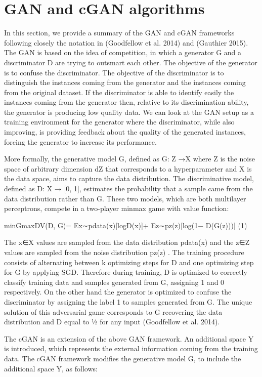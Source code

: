 \documentclass[parskip=full]{scrartcl}
\begin{document}
\section{GAN and cGAN algorithms}

In this section, we provide a summary of the GAN and cGAN frameworks following
closely the notation in (Goodfellow et al. 2014) and (Gauthier 2015). The GAN is
based on the idea of competition, in which a generator G and a discriminator D
are trying to outsmart each other. The objective of the generator is to confuse
the discriminator. The objective of the discriminator is to distinguish the
instances coming from the generator and the instances coming from the original
dataset. If the discriminator is able to identify easily the instances coming
from the generator then, relative to its discrimination ability, the generator
is producing low quality data. We can look at the GAN setup as a training
environment for the generator where the discriminator, while also improving, is
providing feedback about the quality of the generated instances, forcing the
generator to increase its performance.

More formally, the generative model G, defined as G: Z →X where Z is the noise
space of arbitrary dimension dZ that corresponds to a hyperparameter and X is
the data space, aims to capture the data distribution. The discriminative model,
defined as D: X → [0, 1], estimates the probability that a sample came from the
data distribution rather than G. These two models, which are both multilayer
perceptrons, compete in a two-player minmax game with value function: 

minGmaxDV(D, G)= Ex∼pdata(x)[logD(x)]+ Ez∼pz(z)[log(1− D(G(z)))] (1)

The x∈X values are sampled from the data distribution pdata(x) and the z∈Z
values are sampled from the noise distribution pz(z) . The training procedure
consists of alternating between k optimizing steps for D and one optimizing step
for G by applying SGD. Therefore during training, D is optimized to correctly
classify training data and samples generated from G, assigning 1 and 0
respectively. On the other hand the generator is optimized to confuse the
discriminator by assigning the label 1 to samples generated from G. The unique
solution of this adversarial game corresponds to G recovering the data
distribution and D equal to ½ for any input (Goodfellow et al. 2014). 

The cGAN is an extension of the above GAN framework. An additional space Y is
introduced, which represents the external information coming from the training
data. The cGAN framework modifies the generative model G, to include the
additional space Y, as follows: 
\end{document}
